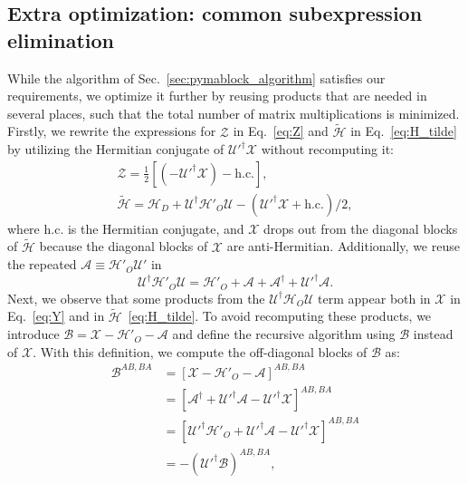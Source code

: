 \subsection{Extra optimization: common subexpression elimination}
While the algorithm of Sec.~\ref{sec:pymablock_algorithm} satisfies our requirements, we optimize it further by reusing products that are needed in several places, such that the total number of matrix multiplications is minimized.
Firstly, we rewrite the expressions for $\mathcal{Z}$ in Eq.~\eqref{eq:Z} and $\tilde{\mathcal{H}}$ in Eq.~\eqref{eq:H_tilde} by utilizing the Hermitian conjugate of $\mathcal{U}'^\dagger \mathcal{X}$ without recomputing it:
%
\begin{gather*}
\mathcal{Z} = \frac{1}{2}\left[(-\mathcal{U}'^\dagger \mathcal{X})- \textrm{h.c.}\right],\\
\tilde{\mathcal{H}} = \mathcal{H}_{D} + \mathcal{U}^\dagger \mathcal{H}'_{O} \mathcal{U} - (\mathcal{U}'^\dagger \mathcal{X} + \textrm{h.c.})/2,
\end{gather*}
%
where $\textrm{h.c.}$ is the Hermitian conjugate, and $\mathcal{X}$ drops out from the diagonal blocks of $\tilde{\mathcal{H}}$ because the diagonal blocks of $\mathcal{X}$ are anti-Hermitian.
%
Additionally, we reuse the repeated $\mathcal{A} \equiv \mathcal{H}'_{O}\mathcal{U}'$ in
%
\begin{equation}
\label{eq:UHU}
\mathcal{U}^\dagger \mathcal{H}'_{O} \mathcal{U} = \mathcal{H}'_{O} + \mathcal{A} + \mathcal{A}^\dagger + \mathcal{U}'^\dagger \mathcal{A}.
\end{equation}
%
Next, we observe that some products from the $\mathcal{U}^{\dagger} \mathcal{H}_{O}\mathcal{U}$ term appear both in $\mathcal{X}$ in Eq.~\eqref{eq:Y} and in $\tilde{\mathcal{H}}$~\eqref{eq:H_tilde}.
%
To avoid recomputing these products, we introduce $\mathcal{B} = \mathcal{X} - \mathcal{H}'_{O} - \mathcal{A}$ and define the recursive algorithm using $\mathcal{B}$ instead of $\mathcal{X}$.
%
With this definition, we compute the off-diagonal blocks of $\mathcal{B}$ as:
%
\begin{equation}
\label{eq:B_offdiag}
\begin{aligned}
  \mathcal{B}^{AB, BA} &= \left[\mathcal{X} - \mathcal{H}'_{O} - \mathcal{A} \right]^{AB, BA}\\
  &= \left[\mathcal{A}^\dagger + \mathcal{U}'^\dagger\mathcal{A} - \mathcal{U}'^\dagger \mathcal{X} \right]^{AB, BA}\\
  &= \left[\mathcal{U}'^\dagger\mathcal{H}'_{O} + \mathcal{U}'^\dagger\mathcal{A} - \mathcal{U}'^\dagger \mathcal{X} \right]^{AB, BA}\\
  &= -(\mathcal{U'}^\dagger \mathcal{B})^{AB, BA},
\end{aligned}
\end{equation}

